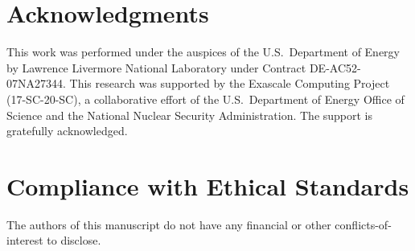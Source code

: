 \documentclass[12pt]{article}
\begin{document}






\section*{Acknowledgments}

This work was performed under the auspices of the U.S.\ Department of Energy by Lawrence Livermore National Laboratory under Contract DE-AC52-07NA27344. This research was supported by the Exascale Computing Project (17-SC-20-SC), a collaborative effort of the U.S.\ Department of Energy Office of Science and the National Nuclear Security Administration. The support is gratefully acknowledged. 

\section*{Compliance with Ethical Standards}

The authors of this manuscript do not have any financial or other conflicts-of-interest to disclose.  


 

\end{document}
